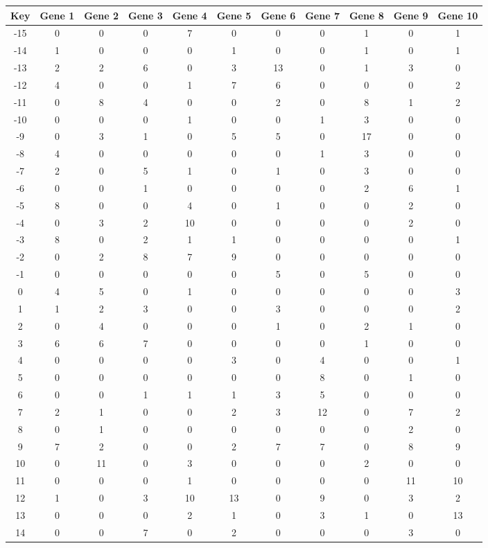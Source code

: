 \begin{tabular}{|c|c|c|c|c|c|c|c|c|c|c|}
\hline
Key & Gene 1 & Gene 2 & Gene 3 & Gene 4 & Gene 5 & Gene 6 & Gene 7 & Gene 8 & Gene 9 & Gene 10 \\
\hline
-15 & 0 & 0 & 0 & 7 & 0 & 0 & 0 & 1 & 0 & 1 \\
-14 & 1 & 0 & 0 & 0 & 1 & 0 & 0 & 1 & 0 & 1 \\
-13 & 2 & 2 & 6 & 0 & 3 & 13 & 0 & 1 & 3 & 0 \\
-12 & 4 & 0 & 0 & 1 & 7 & 6 & 0 & 0 & 0 & 2 \\
-11 & 0 & 8 & 4 & 0 & 0 & 2 & 0 & 8 & 1 & 2 \\
-10 & 0 & 0 & 0 & 1 & 0 & 0 & 1 & 3 & 0 & 0 \\
-9 & 0 & 3 & 1 & 0 & 5 & 5 & 0 & 17 & 0 & 0 \\
-8 & 4 & 0 & 0 & 0 & 0 & 0 & 1 & 3 & 0 & 0 \\
-7 & 2 & 0 & 5 & 1 & 0 & 1 & 0 & 3 & 0 & 0 \\
-6 & 0 & 0 & 1 & 0 & 0 & 0 & 0 & 2 & 6 & 1 \\
-5 & 8 & 0 & 0 & 4 & 0 & 1 & 0 & 0 & 2 & 0 \\
-4 & 0 & 3 & 2 & 10 & 0 & 0 & 0 & 0 & 2 & 0 \\
-3 & 8 & 0 & 2 & 1 & 1 & 0 & 0 & 0 & 0 & 1 \\
-2 & 0 & 2 & 8 & 7 & 9 & 0 & 0 & 0 & 0 & 0 \\
-1 & 0 & 0 & 0 & 0 & 0 & 5 & 0 & 5 & 0 & 0 \\
0 & 4 & 5 & 0 & 1 & 0 & 0 & 0 & 0 & 0 & 3 \\
1 & 1 & 2 & 3 & 0 & 0 & 3 & 0 & 0 & 0 & 2 \\
2 & 0 & 4 & 0 & 0 & 0 & 1 & 0 & 2 & 1 & 0 \\
3 & 6 & 6 & 7 & 0 & 0 & 0 & 0 & 1 & 0 & 0 \\
4 & 0 & 0 & 0 & 0 & 3 & 0 & 4 & 0 & 0 & 1 \\
5 & 0 & 0 & 0 & 0 & 0 & 0 & 8 & 0 & 1 & 0 \\
6 & 0 & 0 & 1 & 1 & 1 & 3 & 5 & 0 & 0 & 0 \\
7 & 2 & 1 & 0 & 0 & 2 & 3 & 12 & 0 & 7 & 2 \\
8 & 0 & 1 & 0 & 0 & 0 & 0 & 0 & 0 & 2 & 0 \\
9 & 7 & 2 & 0 & 0 & 2 & 7 & 7 & 0 & 8 & 9 \\
10 & 0 & 11 & 0 & 3 & 0 & 0 & 0 & 2 & 0 & 0 \\
11 & 0 & 0 & 0 & 1 & 0 & 0 & 0 & 0 & 11 & 10 \\
12 & 1 & 0 & 3 & 10 & 13 & 0 & 9 & 0 & 3 & 2 \\
13 & 0 & 0 & 0 & 2 & 1 & 0 & 3 & 1 & 0 & 13 \\
14 & 0 & 0 & 7 & 0 & 2 & 0 & 0 & 0 & 3 & 0 \\
\hline
\end{tabular}